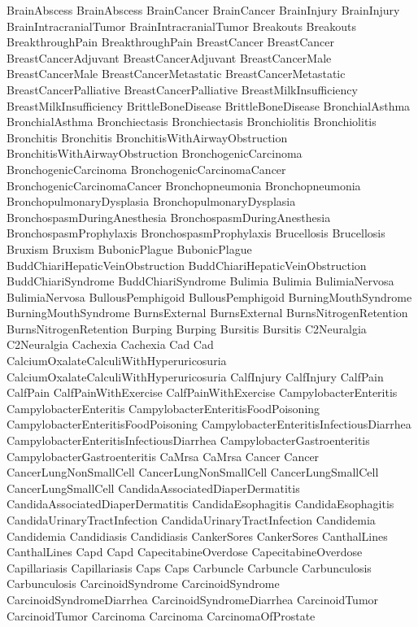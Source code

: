  BrainAbscess
 BrainAbscess
 BrainCancer
 BrainCancer
 BrainInjury
 BrainInjury
 BrainIntracranialTumor
 BrainIntracranialTumor
 Breakouts
 Breakouts
 BreakthroughPain
 BreakthroughPain
 BreastCancer
 BreastCancer
 BreastCancerAdjuvant
 BreastCancerAdjuvant
 BreastCancerMale
 BreastCancerMale
 BreastCancerMetastatic
 BreastCancerMetastatic
 BreastCancerPalliative
 BreastCancerPalliative
 BreastMilkInsufficiency
 BreastMilkInsufficiency
 BrittleBoneDisease
 BrittleBoneDisease
 BronchialAsthma
 BronchialAsthma
 Bronchiectasis
 Bronchiectasis
 Bronchiolitis
 Bronchiolitis
 Bronchitis
 Bronchitis
 BronchitisWithAirwayObstruction
 BronchitisWithAirwayObstruction
 BronchogenicCarcinoma
 BronchogenicCarcinoma
 BronchogenicCarcinomaCancer
 BronchogenicCarcinomaCancer
 Bronchopneumonia
 Bronchopneumonia
 BronchopulmonaryDysplasia
 BronchopulmonaryDysplasia
 BronchospasmDuringAnesthesia
 BronchospasmDuringAnesthesia
 BronchospasmProphylaxis
 BronchospasmProphylaxis
 Brucellosis
 Brucellosis
 Bruxism
 Bruxism
 BubonicPlague
 BubonicPlague
 BuddChiariHepaticVeinObstruction
 BuddChiariHepaticVeinObstruction
 BuddChiariSyndrome
 BuddChiariSyndrome
 Bulimia
 Bulimia
 BulimiaNervosa
 BulimiaNervosa
 BullousPemphigoid
 BullousPemphigoid
 BurningMouthSyndrome
 BurningMouthSyndrome
 BurnsExternal
 BurnsExternal
 BurnsNitrogenRetention
 BurnsNitrogenRetention
 Burping
 Burping
 Bursitis
 Bursitis
 C2Neuralgia
 C2Neuralgia
 Cachexia
 Cachexia
 Cad
 Cad
 CalciumOxalateCalculiWithHyperuricosuria
 CalciumOxalateCalculiWithHyperuricosuria
 CalfInjury
 CalfInjury
 CalfPain
 CalfPain
 CalfPainWithExercise
 CalfPainWithExercise
 CampylobacterEnteritis
 CampylobacterEnteritis
 CampylobacterEnteritisFoodPoisoning
 CampylobacterEnteritisFoodPoisoning
 CampylobacterEnteritisInfectiousDiarrhea
 CampylobacterEnteritisInfectiousDiarrhea
 CampylobacterGastroenteritis
 CampylobacterGastroenteritis
 CaMrsa
 CaMrsa
 Cancer
 Cancer
 CancerLungNonSmallCell
 CancerLungNonSmallCell
 CancerLungSmallCell
 CancerLungSmallCell
 CandidaAssociatedDiaperDermatitis
 CandidaAssociatedDiaperDermatitis
 CandidaEsophagitis
 CandidaEsophagitis
 CandidaUrinaryTractInfection
 CandidaUrinaryTractInfection
 Candidemia
 Candidemia
 Candidiasis
 Candidiasis
 CankerSores
 CankerSores
 CanthalLines
 CanthalLines
 Capd
 Capd
 CapecitabineOverdose
 CapecitabineOverdose
 Capillariasis
 Capillariasis
 Caps
 Caps
 Carbuncle
 Carbuncle
 Carbunculosis
 Carbunculosis
 CarcinoidSyndrome
 CarcinoidSyndrome
 CarcinoidSyndromeDiarrhea
 CarcinoidSyndromeDiarrhea
 CarcinoidTumor
 CarcinoidTumor
 Carcinoma
 Carcinoma
 CarcinomaOfProstate
